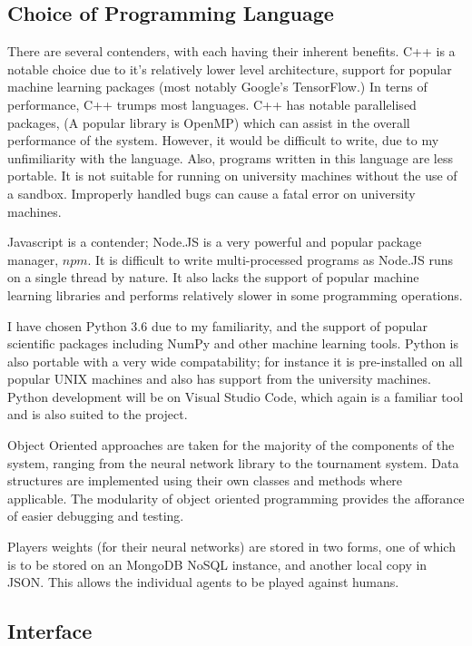 \documentclass[12pt,a4paper]{article}
\begin{document}
\subsection*{Choice of Programming Language}

    There are several contenders, with each having their inherent benefits. C++ is a notable choice due to it's relatively lower level architecture, support for popular machine learning packages (most notably Google's TensorFlow.) In terns of performance, C++ trumps most languages. C++ has notable parallelised packages, (A popular library is OpenMP) which can assist in the overall performance of the system. However, it would be difficult to write, due to my unfimiliarity with the language. Also, programs written in this language are less portable. It is not suitable for running on university machines without the use of a sandbox. Improperly handled bugs can cause a fatal error on university machines.

    Javascript is a contender; Node.JS is a very powerful and popular package manager, $npm$. It is difficult to write multi-processed programs as Node.JS runs on a single thread by nature. It also lacks the support of popular machine learning libraries and performs relatively slower in some programming operations.

    I have chosen Python 3.6 due to my familiarity, and the support of popular scientific packages including NumPy and other machine learning tools. Python is also portable with a very wide compatability; for instance it is pre-installed on all popular UNIX machines and also has support from the university machines. Python development will be on Visual Studio Code, which again is a familiar tool and is also suited to the project.

    Object Oriented approaches are taken for the majority of the components of the system, ranging from the neural network library to the tournament system. Data structures are implemented using their own classes and methods where applicable. The modularity of object oriented programming provides the afforance of easier debugging and testing.

    Players weights (for their neural networks) are stored in two forms, one of which is to be stored on an MongoDB NoSQL instance, and another local copy in JSON. This allows the individual agents to be played against humans.

\subsection*{Interface}
\end{document}

